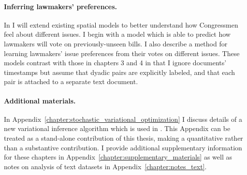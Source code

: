 
\paragraph{Inferring lawmakers' preferences.}

In  I will extend existing spatial models to better
understand how Congressmen feel about different issues.  I begin with
a model which is able to predict how lawmakers will vote on
previously-unseen bills. I also describe a method for learning
lawmakers' issue preferences from their votes on different issues.
These models contrast with those in chapters 3 and 4 in that I ignore
documents' timestamps but assume that dyadic pairs are explicitly
labeled, and that each pair is attached to a separate text document.

\paragraph{Additional materials.}
In Appendix~\ref{chapter:stochastic_variational_optimization} I
discuss details of a new variational inference algorithm which is used
in .  This Appendix can be treated as a
stand-alone contribution of this thesis, making a quantitative rather
than a substantive contribution.  I provide additional supplementary
information for these chapters in
Appendix~\ref{chapter:supplementary_materials} as well as notes on
analysis of text datasets in Appendix~\ref{chapter:notes_text}.
